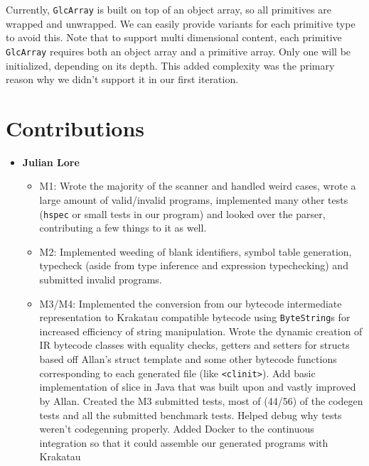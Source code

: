 \documentclass[11pt]{article}
\begin{document}
Currently, \texttt{GlcArray} is built on top of an object array,
so all primitives are wrapped and unwrapped.
We can easily provide variants for each primitive type to avoid this.
Note that to support multi dimensional content,
each primitive \texttt{GlcArray} requires both an object array and a primitive array. Only one will be initialized, depending on its depth.
This added complexity was the primary reason why we didn't support it in our first iteration.

\section{Contributions}
\begin{itemize}
	\item \textbf{Julian Lore}
	\begin{itemize}
		\item M1: Wrote the majority of the scanner and
		handled weird cases, wrote a large amount of valid/invalid programs,
		implemented many other tests (\texttt{hspec} or small tests in our
		program) and looked over the parser, contributing a few things to it
		as well.
		\item M2: Implemented weeding of blank identifiers,
		symbol table generation, typecheck (aside from type inference and
		expression typechecking) and submitted invalid programs.
		\item M3/M4: Implemented the conversion from our
                  bytecode intermediate representation to
                  Krakatau\cite{krakatau} compatible bytecode using
                  \texttt{ByteString}s for increased efficiency of
                  string manipulation. Wrote the dynamic creation of
                  IR bytecode classes with equality checks, getters
                  and setters for structs based off Allan's
                  struct template and some other bytecode functions
                  corresponding to each generated file (like
                  \texttt{<clinit>}). Add basic implementation of
                  slice in Java that was built upon and vastly
                  improved by Allan. Created the M3 submitted tests,
                  most of (44/56) of the codegen tests and all the
                  submitted benchmark tests. Helped debug why tests
                  weren't codegenning properly. Added Docker to the
                  continuous integration so that it could assemble our
                  generated programs with Krakatau\cite{krakatau}

\end{itemize}
\end{itemize}
\end{document}
